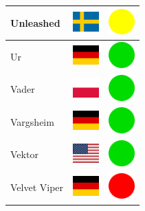 \documentclass[12pt, a4paper, twoside]{report}
\begin{document}
\begin{center}
\begin{longtable}{|p{5cm}|p{2cm}|p{2cm}|}
			Unleashed & \includegraphics[width=1cm]{4x3/se} & \includegraphics[width=1cm]{likes/m} \\ \hline
			Ur & \includegraphics[width=1cm]{4x3/de} & \includegraphics[width=1cm]{likes/y} \\ \hline
			Vader & \includegraphics[width=1cm]{4x3/pl} & \includegraphics[width=1cm]{likes/y} \\ \hline
			Vargsheim & \includegraphics[width=1cm]{4x3/de} & \includegraphics[width=1cm]{likes/y} \\ \hline
			Vektor & \includegraphics[width=1cm]{4x3/us} & \includegraphics[width=1cm]{likes/y} \\ \hline
			Velvet Viper & \includegraphics[width=1cm]{4x3/de} & \includegraphics[width=1cm]{likes/n} \\ \hline

\end{longtable}
\end{center}
\end{document}
